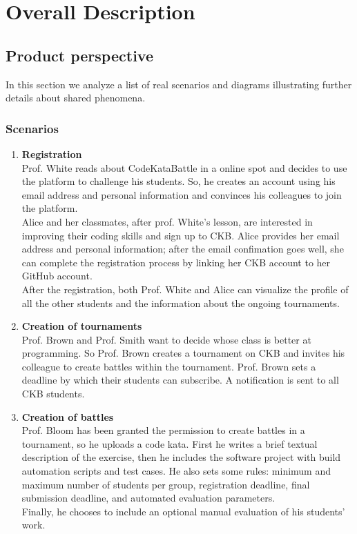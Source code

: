 \chapter{Overall Description}

\section{Product perspective}
In this section we analyze a list of real 
scenarios and diagrams illustrating further details about shared phenomena.\\

\subsection{Scenarios}
\begin{enumerate}
    \item \textbf{Registration} \\
    Prof. White reads about CodeKataBattle in a online spot and decides to use the platform to 
    challenge his students. So, he creates an account using his email address and personal information 
    and convinces his colleagues to join the platform.\\
    Alice and her classmates, after prof. White's lesson, are interested in improving their coding 
    skills and sign up to CKB. Alice provides her email address and personal information; after the email 
    confimation goes well, 
    she can complete the registration process by linking her CKB account to her GitHub account.\\
    After the registration, both Prof. White and Alice can visualize the profile of all the other 
    students and the information about the ongoing tournaments.

    \item \textbf{Creation of tournaments} \\
    Prof. Brown and Prof. Smith want to decide whose class is better at programming. So Prof. Brown 
    creates a tournament on CKB and invites his colleague to create battles within the tournament. Prof. Brown 
    sets a deadline by which their students can subscribe. A notification is sent to all CKB students.
    
    \item \textbf{Creation of battles} \\
    Prof. Bloom has been granted the permission to create battles in a tournament, so he uploads a 
    code kata. First he writes a brief textual description of the exercise, then he includes 
    the software project with build automation scripts and test cases. He also sets some rules: 
    minimum and maximum number of students per group, registration deadline, final submission deadline, and
    automated evaluation parameters.\\
    Finally, he chooses to include an optional manual evaluation of his students' work.


\end{enumerate}
